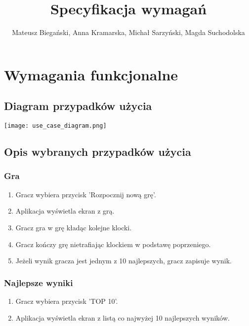 \documentclass{article}
\begin{document}
\title{Specyfikacja wymagań}

\author{Mateusz Biegański, Anna Kramarska, Michał Sarzyński, Magda Suchodolska}
\maketitle

\section{Wymagania funkcjonalne}

\subsection{Diagram przypadków użycia}

\begin{center}
    \texttt{[image: use\_case\_diagram.png]}
\end{center}

\subsection{Opis wybranych przypadków użycia}

\subsubsection{Gra}

\begin{enumerate}
    \item Gracz wybiera przycisk 'Rozpocznij nową grę'.
    \item Aplikacja wyświetla ekran z grą.
    \item Gracz gra w grę kładąc kolejne klocki.
    \item Gracz kończy grę nietrafiając klockiem w podstawę poprzeniego.
    \item Jeżeli wynik gracza jest jednym z 10 najlepszych, gracz zapisuje wynik.
\end{enumerate}

\subsubsection{Najlepsze wyniki}
\begin{enumerate}
    \item Gracz wybiera przycisk 'TOP 10'.
    \item Aplikacja wyświetla ekran z listą co najwyżej 10 najlepszych wyników.
\end{enumerate}
\end{document}
